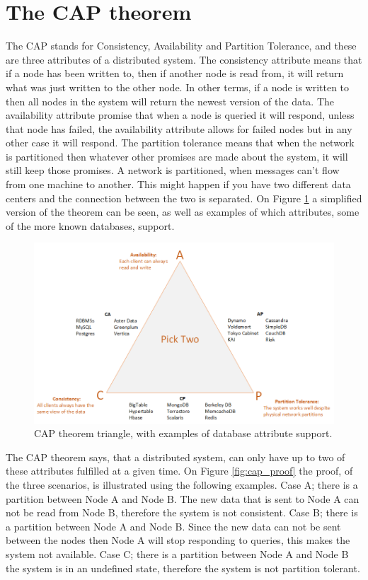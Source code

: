 \section{The CAP theorem}
The CAP stands for Consistency, Availability and Partition Tolerance, and these are three attributes of a distributed system. The consistency attribute means that if a node has been written to, then if another node is read from, it will return what was just written to the other node. In other terms, if a node is written to then all nodes in the system  will return the newest version of the data. The availability attribute promise that when a node is queried it will respond, unless that node has failed, the availability attribute allows for failed nodes but in any other case it will respond. The partition tolerance means that when the network is partitioned then whatever other promises are made about the system, it will still keep those promises. A network is partitioned, when messages can't flow from one machine to another. This might happen if you have two different data centers and the connection between the two is separated. On Figure \ref{fig:cap_triangle} a simplified version of the theorem can be seen, as well as examples of which attributes, some  of the more known databases, support.

\begin{figure}[h!]
	\centering
	\includegraphics[width=0.61\linewidth]{consistency/fig/cap_triangle.png}
	\caption{CAP theorem triangle, with examples of database attribute support.}
	\label{fig:cap_triangle}
\end{figure}

The CAP theorem says, that a distributed system, can only have up to two of these attributes fulfilled at a given time. On Figure \ref{fig:cap_proof} the proof, of the three scenarios, is illustrated using the following examples. Case A; there is a partition between Node A and Node B. The new data that is sent to Node A can not be read from Node B, therefore the system is not consistent. Case B; there is a partition between Node A and Node B. Since the new data can not be sent between the nodes then Node A will stop responding to queries, this makes the system not available. Case C; there is a partition between Node A and Node B the system is in an undefined state, therefore the system is not partition tolerant.

